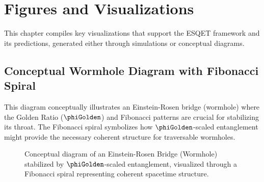 \chapter{Figures and Visualizations}
\label{ch:figures}

This chapter compiles key visualizations that support the ESQET framework and its predictions, generated either through simulations or conceptual diagrams.

\section{Conceptual Wormhole Diagram with Fibonacci Spiral}
This diagram conceptually illustrates an Einstein-Rosen bridge (wormhole) where the Golden Ratio ($\phiGolden$) and Fibonacci patterns are crucial for stabilizing its throat. The Fibonacci spiral symbolizes how $\phiGolden$-scaled entanglement might provide the necessary coherent structure for traversable wormholes.

\begin{figure}[h!]
    \centering
    \caption{Conceptual diagram of an Einstein-Rosen Bridge (Wormhole) stabilized by $\phiGolden$-scaled entanglement, visualized through a Fibonacci spiral representing coherent spacetime structure.}
    \label{fig:wormhole_fibonacci}
\end{figure}

